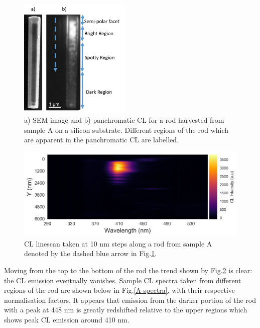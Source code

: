 \begin{figure}[!h]
	\centering
	\includegraphics[width=0.48\textwidth]{Figs/Ch6/A-CL-scan.png}
	\caption {a) SEM image and b) panchromatic CL for a rod harvested from sample A on a silicon substrate. Different regions of the rod which are apparent in the panchromatic CL are labelled.}
	\label{sampleAscan}
\end{figure}
\FloatBarrier

\begin{figure}[!h]
	\centering
	\includegraphics[width=1\textwidth]{Figs/Ch6/CLscan}
	\caption {CL linescan taken at 10 nm steps along a rod from sample A denoted by the dashed blue arrow in Fig.\ref{sampleAscan}.}
	\label{sampleAscanCL}
\end{figure}
\FloatBarrier

Moving from the top to the bottom of the rod the trend shown by Fig.\ref{sampleAscanCL} is clear: the CL emission eventually vanishes.
Sample CL spectra taken from different regions of the rod are shown below in Fig.\ref{A-spectra}, with their respective normalisation factors. It appears that emission from the darker portion of the rod with a peak at 448 nm is greatly redshifted relative to the upper regions which shows peak CL emission around 410 nm.

